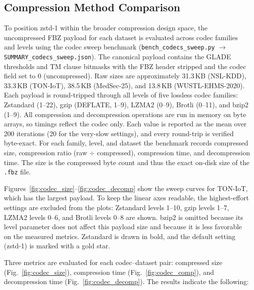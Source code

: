 \documentclass[journal,twoside,web]{ieeecolor}
\begin{document}
\subsection{Compression Method Comparison}
\label{sec:res-codecs}

To position zstd-1 within the broader compression design space, the
uncompressed FBZ payload for each dataset is evaluated across
codec families and levels using the codec sweep benchmark
(\texttt{bench\_codecs\_sweep.py} $\rightarrow$
\texttt{SUMMARY\_codecs\_sweep.json}). The canonical payload contains
the GLADE thresholds and TM clause bitmasks with the FBZ header
stripped and the codec field set to 0 (uncompressed). Raw sizes are
approximately 31.3\,KB (NSL-KDD), 33.3\,KB (TON-IoT), 38.5\,KB
(MedSec-25), and 13.8\,KB (WUSTL-EHMS-2020). Each payload is
round-tripped through all levels of five lossless codec families:
Zstandard (1--22), gzip (DEFLATE, 1--9), LZMA2 (0--9), Brotli (0--11),
and bzip2 (1--9). All compression and decompression operations are run
in memory on byte arrays, so timings reflect the codec only. Each
value is reported as the mean over 200 iterations (20 for the very-slow
settings), and every round-trip is verified byte-exact. For each
family, level, and dataset the benchmark records compressed size,
compression ratio (raw $\div$ compressed), compression time, and
decompression time. The size is the compressed byte count and thus
the exact on-disk size of the \texttt{.fbz} file.

Figures~\ref{fig:codec_size}--\ref{fig:codec_decomp} show the sweep
curves for TON-IoT, which has the largest payload. To keep the linear
axes readable, the highest-effort settings are excluded from the plots:
Zstandard levels 1--10, gzip levels 1--7, LZMA2 levels 0--6, and
Brotli levels 0--8 are shown. bzip2 is omitted because its level
parameter does not affect this payload size and because it is less
favorable on the measured metrics. Zstandard is drawn in bold, and the
default setting (zstd-1) is marked with a gold star.

Three metrics are evaluated for each codec--dataset pair:
compressed size (Fig.~\ref{fig:codec_size}), compression time
(Fig.~\ref{fig:codec_comp}), and decompression time
(Fig.~\ref{fig:codec_decomp}). The results indicate the following:
\end{document}
